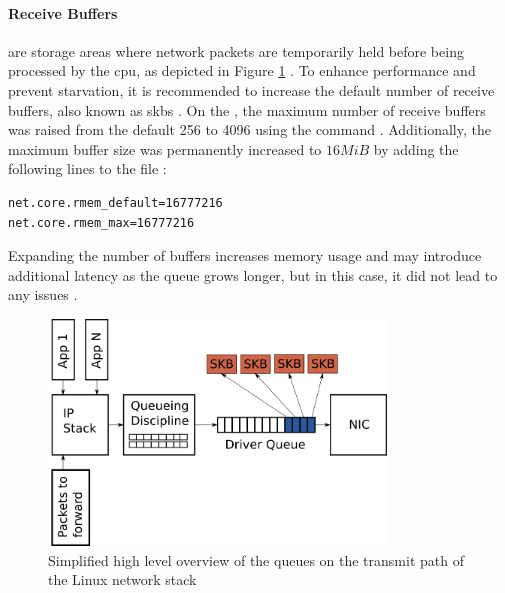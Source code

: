 \paragraph{Receive Buffers} are storage areas where network packets are temporarily held before being processed by the \gls{cpu}, as depicted in Figure \ref{fig:linux_network} \cite{danQueueingLinuxNetwork2013}.
To enhance performance and prevent starvation, it is recommended to increase the default number of receive buffers, also known as \glspl{skb} \cite{lucidvisionlabsReceiveBuffers2020} \cite{danQueueingLinuxNetwork2013}.
On the \jx, the maximum number of receive buffers was raised from the default 256 to 4096 using the command  \cite{danQueueingLinuxNetwork2013}.
Additionally, the maximum buffer size was permanently increased to $16MiB$ by adding the following lines to the  file \cite{redhat10ChangingNetwork}\cite{ibmIBMDocumentationTCPIP2021}:

\begin{verbatim}
net.core.rmem_default=16777216
net.core.rmem_max=16777216
\end{verbatim}

Expanding the number of buffers increases memory usage and may introduce additional latency as the queue grows longer, but in this case, it did not lead to any issues \cite{danQueueingLinuxNetwork2013}.

\begin{figure}[H]
    \centering
    \includegraphics[width=0.8\textwidth]{figures/linux_networking.png}
    \caption{Simplified high level overview of the queues on the transmit path of the Linux network stack \cite{danQueueingLinuxNetwork2013}}
    \label{fig:linux_network}
\end{figure}

